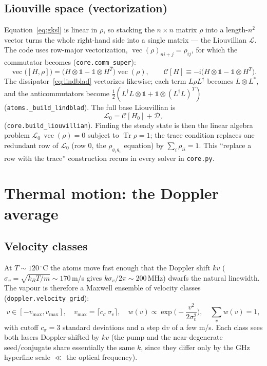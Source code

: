 \documentclass[11pt]{article}
\newcommand{\Tr}{\operatorname{Tr}}
\newcommand{\vecop}{\operatorname{vec}}
\newcommand{\ii}{\mathrm{i}}
\newcommand{\dd}{\mathrm{d}}
\newcommand{\code}[1]{\texttt{#1}}
\newcommand{\Lcal}{\mathcal{L}}
\newcommand{\Dcal}{\mathcal{D}}
\begin{document}
\subsection{Liouville space (vectorization)}
\label{sec:liouville}

Equation~\eqref{eq:gksl} is linear in $\rho$, so stacking the $n\times n$ matrix
$\rho$ into a length-$n^2$ vector turns the whole right-hand side into a single
matrix --- the Liouvillian $\Lcal$. The code uses row-major vectorization,
$\vecop(\rho)_{n i+j}=\rho_{ij}$, for which the commutator becomes
(\code{core.comm\_super}):
\begin{equation}
\vecop\big([H,\rho]\big)=\big(H\otimes \mathbb{1}-\mathbb{1}\otimes H^{T}\big)\vecop(\rho),
\qquad
\mathcal{C}[H]\equiv-\ii\big(H\otimes \mathbb{1}-\mathbb{1}\otimes H^{T}\big).
\label{eq:commsuper}
\end{equation}
The dissipator~\eqref{eq:lindblad} vectorizes likewise; each term
$L\rho L^\dagger$ becomes $L\otimes L^{*}$, and the anticommutators become
$\tfrac12(L^\dagger L\otimes\mathbb{1}+\mathbb{1}\otimes(L^\dagger L)^{T})$
(\code{atoms.\_build\_lindblad}). The full base Liouvillian is
\begin{equation}
\Lcal_0=\mathcal{C}[H_0]+\Dcal,
\label{eq:liouvillian}
\end{equation}
(\code{core.build\_liouvillian}). Finding the steady state is then the linear
algebra problem $\Lcal_0\,\vecop(\rho)=0$ subject to $\Tr\rho=1$; the trace
condition replaces one redundant row of $\Lcal_0$ (row $0$, the
$\rho_{g_1g_1}$ equation) by $\sum_i\rho_{ii}=1$. This ``replace a row with the
trace'' construction recurs in every solver in \code{core.py}.

\section{Thermal motion: the Doppler average}
\label{sec:dopp}

\subsection{Velocity classes}

At $T\sim120\,^\circ$C the atoms move fast enough that the Doppler shift $k v$
($\sigma_v=\sqrt{k_B T/m}\sim170\,$m/s gives $k\sigma_v/2\pi\sim200\,$MHz) dwarfs
the natural linewidth. The vapour is therefore a Maxwell ensemble of velocity
classes (\code{doppler.velocity\_grid}):
\begin{equation}
v\in[-v_{\max},v_{\max}],\quad
v_{\max}=\lceil c_\sigma\,\sigma_v\rceil,\quad
w(v)\propto \exp\!\Big(-\frac{v^2}{2\sigma_v^2}\Big),\quad \sum_v w(v)=1,
\end{equation}
with cutoff $c_\sigma=3$ standard deviations and a step $\dd v$ of a few m/s. Each
class sees both lasers Doppler-shifted by $kv$ (the pump and the near-degenerate
seed/conjugate share essentially the same $k$, since they differ only by the GHz
hyperfine scale $\ll$ the optical frequency).
\end{document}
